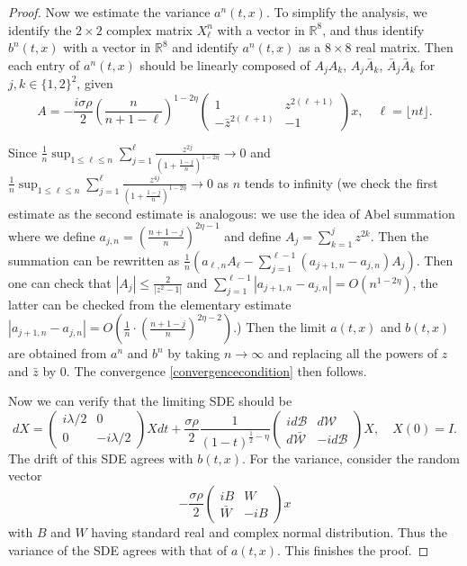 \documentclass[12pt, reqno]{amsart}
\theoremstyle{definition}
\theoremstyle{remark}
\numberwithin{equation}{section}
\begin{document}
\begin{proof}
Now we estimate the variance $a^n(t,x).$ To simplify the analysis, we identify the $2\times 2$ complex matrix $X_\ell^n$ with a vector in $\mathbb{R}^8$, and thus identify $b^n(t,x)$ with a vector in $\mathbb{R}^8$ and identify $a^n(t,x)$ as a $8\times 8$ real matrix. Then each entry of $a^n(t,x)$ should be linearly composed of $A_jA_k$, $A_j\bar{A}_k$, $\bar{A}_j\bar{A}_k$ for $j,k\in\{1,2\}^2$, given
$$A=-\frac{i\sigma\rho}{2}(\frac{n}{n+1-\ell})^{1-2\eta}\begin{pmatrix}1&z^{2(\ell+1)}\\-\bar{z}^{2(\ell+1)}& -1\end{pmatrix}x,\quad \ell=\lfloor nt\rfloor.$$


Since $\frac{1}{n}\sup_{1\leq \ell\leq n} \sum_{j=1}^\ell \frac{z^{2j}}{(1+\frac{1-j}{n})^{1-2\eta}}\to 0$ and $\frac{1}{n}\sup_{1\leq \ell\leq n} \sum_{j=1}^\ell \frac{z^{4j}}{(1+\frac{1-j}{n})^{1-2\eta}}\to 0$ as $n$ tends to infinity (we check the first estimate as the second estimate is analogous: we use the idea of Abel summation where we define $a_{j,n}=(\frac{n+1-j}{n})^{2\eta-1}$ and define $A_j=\sum_{k=1}^j z^{2k}$. Then the summation can be rewritten as $\frac{1}{n}(a_{\ell,n} A_\ell-\sum_{j=1}^{\ell-1} (a_{j+1,n}-a_{j,n})A_j)$. Then one can check that $|A_j|\leq\frac{2}{{|z^2-1
|}}$ and $\sum_{j=1}^{\ell-1}|a_{j+1,n}-a_{j,n}|=O(n^{1-2\eta})$, the latter can be checked from the elementary estimate $|a_{j+1,n}-a_{j,n}|=O(\frac{1}{n}\cdot (\frac{n+1-j}{n})^{2\eta-2})$.) Then the limit $a(t,x)$ and $b(t,x)$ are obtained from $a^n$ and $b^n$ by taking $n\to\infty$ and replacing all the powers of $z$ and $\bar{z}$ by $0$. The convergence \eqref{convergencecondition} then follows.

Now we can verify that the limiting SDE should be
\begin{equation}\label{noisecoefficient}
    dX=\begin{pmatrix} i\lambda/2&0\\0&-i\lambda/2\end{pmatrix} X dt+\frac{\sigma\rho}{2}\frac{1}{(1-t)^{\frac{1}{2}-\eta}}\begin{pmatrix}
        id\mathcal{B}& d\mathcal{W}\\d\bar{\mathcal{W}}&-id\mathcal{B} \end{pmatrix} X,\quad X(0)=I.
\end{equation}
The drift of this SDE agrees with $b(t,x)$. For the variance, consider the random vector 
$$-\frac{\sigma\rho}{2}\begin{pmatrix}iB&W\\\bar{W}&-iB\end{pmatrix} x$$ with $B$ and $W$ having standard real and complex normal distribution. Thus the variance of the SDE agrees with that of $a(t,x)$. This finishes the proof.


\end{proof}
\end{document}
